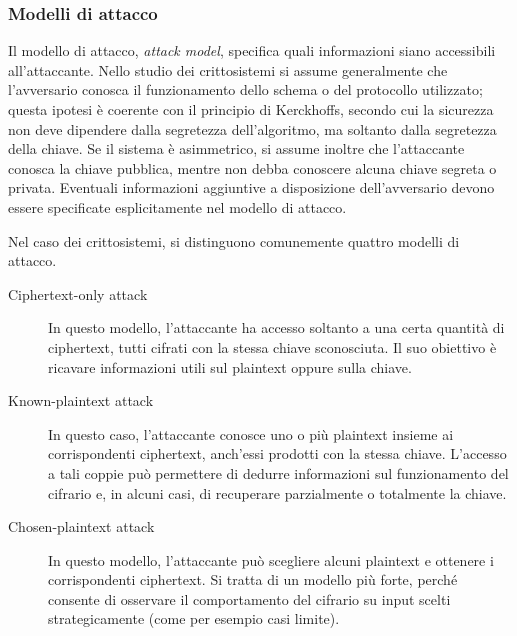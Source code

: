 \subsubsection{Modelli di attacco}

Il modello di attacco, \emph{attack model}, specifica quali informazioni siano accessibili all'attaccante. Nello studio
dei crittosistemi si assume generalmente che l'avversario conosca il funzionamento dello schema o del protocollo
utilizzato; questa ipotesi è coerente con il principio di Kerckhoffs, secondo cui la sicurezza non deve dipendere dalla
segretezza dell'algoritmo, ma soltanto dalla segretezza della chiave. Se il sistema è asimmetrico, si assume inoltre
che l'attaccante conosca la chiave pubblica, mentre non debba conoscere alcuna chiave segreta o privata. Eventuali
informazioni aggiuntive a disposizione dell'avversario devono essere specificate esplicitamente nel modello di attacco.

Nel caso dei crittosistemi, si distinguono comunemente quattro modelli di attacco.

\begin{description}
  \item[Ciphertext-only attack] In questo modello, l'attaccante ha accesso soltanto a una certa quantità di ciphertext,
    tutti cifrati con la stessa chiave sconosciuta. Il suo obiettivo è ricavare informazioni utili sul plaintext oppure
    sulla chiave.
\end{description}

\begin{description}
  \item[Known-plaintext attack] In questo caso, l'attaccante conosce uno o più plaintext insieme ai corrispondenti
    ciphertext, anch'essi prodotti con la stessa chiave. L'accesso a tali coppie può permettere di dedurre informazioni
    sul funzionamento del cifrario e, in alcuni casi, di recuperare parzialmente o totalmente la chiave.
\end{description}

\begin{description}
  \item[Chosen-plaintext attack] In questo modello, l'attaccante può scegliere alcuni plaintext e ottenere i
    corrispondenti ciphertext. Si tratta di un modello più forte, perché consente di osservare il comportamento del
    cifrario su input scelti strategicamente (come per esempio casi limite).
\end{description}

